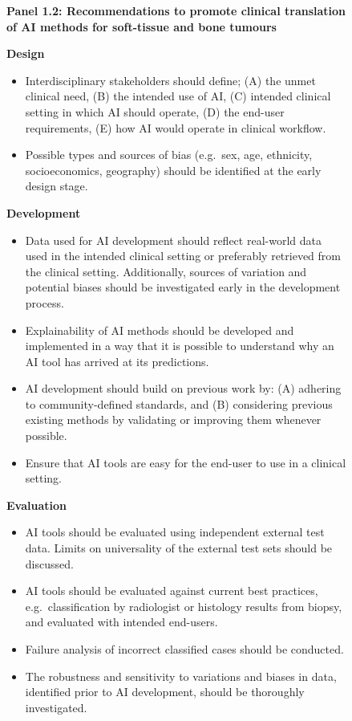 \begin{figure}[htbp]
\begin{framed}
	\small
	\noindent\textbf{Panel 1.2: Recommendations to promote clinical translation of AI methods for soft-tissue and bone tumours}

	\medskip
	\noindent\textbf{Design}
	\begin{itemize}
		\item Interdisciplinary stakeholders should define; (A) the unmet clinical need, (B) the intended use of AI, (C) intended clinical setting in which AI should operate, (D) the end-user requirements, (E) how AI would operate in clinical workflow.
		\item Possible types and sources of bias (e.g.\ sex, age, ethnicity, socioeconomics, geography) should be identified at the early design stage.
	\end{itemize}

	\noindent\textbf{Development}
	\begin{itemize}
		\item Data used for AI development should reflect real-world data used in the intended clinical setting or preferably retrieved from the clinical setting. Additionally, sources of variation and potential biases should be investigated early in the development process.
		\item Explainability of AI methods should be developed and implemented in a way that it is possible to understand why an AI tool has arrived at its predictions.
		\item AI development should build on previous work by: (A) adhering to community-defined standards, and (B) considering previous existing methods by validating or improving them whenever possible.
		\item Ensure that AI tools are easy for the end-user to use in a clinical setting.
	\end{itemize}

	\noindent\textbf{Evaluation}
	\begin{itemize}
		\item AI tools should be evaluated using independent external test data. Limits on universality of the external test sets should be discussed.
		\item AI tools should be evaluated against current best practices, e.g.\ classification by radiologist or histology results from biopsy, and evaluated with intended end-users.
		\item Failure analysis of incorrect classified cases should be conducted.
		\item The robustness and sensitivity to variations and biases in data, identified prior to AI development, should be thoroughly investigated.
	\end{itemize}


\end{framed}
\end{figure}
